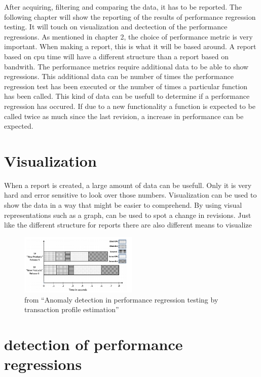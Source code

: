 After acquiring, filtering and comparing the data, it has to be reported. The following chapter will show the reporting of the results of performance regression testing. It will touch on visualization and dectection of the performance regressions. \newline
\newline
As mentioned in chapter 2, the choice of performance metric is very important. When making a report, this is what it will be based around. A report based on cpu time will have a different structure than a report based on bandwith. The performance metrics require additional data to be able to show regressions. This additional data can be number of times the performance regression test has been executed or the number of times a particular function has been called. This kind of data can be usefull to determine if a performance regression has occured. If due to a new functionality a function is expected to be called twice as much since the last revision, a increase in performance can be expected.\newline

\section{Visualization}
When a report is created, a large amount of data can be usefull. Only it is very hard and error sensitive to look over those numbers. Visualization can be used to show the data in a way that might be easier to comprehend. By using visual representations such as a graph, can be used to spot a change in revisions. Just like the different structure for reports there are also different means to visualize

\begin{figure}[h]
\begin{center}
  \includegraphics[width=0.5\textwidth]{Figures/TP.PNG}
\end{center}
  \caption{from ``Anomaly detection in performance regression testing by transaction profile estimation''\cite{ghaith2015anomaly}}

\end{figure}

\section{detection of performance regressions}





